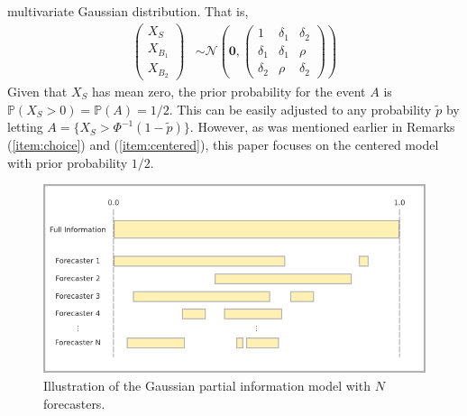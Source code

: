 \documentclass[11pt]{article}
\renewcommand{\P}{\mathbb{P}}
\theoremstyle{definition}
\theoremstyle{definition}
\def\P{{\mathbb P}}
\begin{document}
multivariate Gaussian distribution.  That is,
\begin{align}
\left(\begin{matrix} X_S \\ X_{B_1}\\ X_{B_2} \end{matrix}\right) 
 &\sim \mathcal{N}\left(
 \boldsymbol{0},  \left(\begin{matrix} 
1 & \delta_1 & \delta_2\\
\delta_1 & \delta_1 &\rho\\
\delta_2 & \rho & \delta_2
 \end{matrix}\right)\right) \label{twoforecasters}
\end{align}
Given that $X_S$ has mean zero, the prior probability for the event $A$ is
$\P(X_S > 0) = \P(A) = 1/2$. This can be easily adjusted to any probability
$\tilde{p}$ by letting $A = \{ X_S > \Phi^{-1}(1-\tilde{p}) \}$.  However, as was mentioned earlier in Remarks (\ref{item:choice}) and (\ref{item:centered}), this
paper focuses on the centered model with prior probability
$1/2$. 

\begin{figure}[t]
   \includegraphics[width = \textwidth]{N=N} %
   \caption{Illustration of the Gaussian partial information model with $N$ forecasters.}
   \label{diagramN}
\end{figure}
\end{document}
